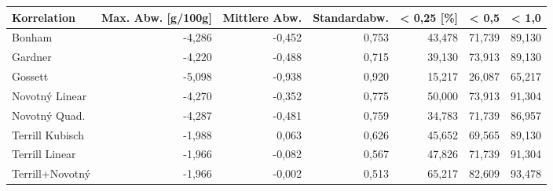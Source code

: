 \begin{tabular}{lrrrrrr}
\toprule
    Korrelation &  Max. Abw. [g/100g] &  Mittlere Abw. &  Standardabw. &  < 0,25 [\%] &  < 0,5 &  < 1,0 \\
\midrule
         Bonham &              -4,286 &         -0,452 &         0,753 &      43,478 & 71,739 & 89,130 \\
        Gardner &              -4,220 &         -0,488 &         0,715 &      39,130 & 73,913 & 89,130 \\
        Gossett &              -5,098 &         -0,938 &         0,920 &      15,217 & 26,087 & 65,217 \\
 Novotný Linear &              -4,270 &         -0,352 &         0,775 &      50,000 & 73,913 & 91,304 \\
  Novotný Quad. &              -4,287 &         -0,481 &         0,759 &      34,783 & 71,739 & 86,957 \\
Terrill Kubisch &              -1,988 &          0,063 &         0,626 &      45,652 & 69,565 & 89,130 \\
 Terrill Linear &              -1,966 &         -0,082 &         0,567 &      47,826 & 71,739 & 91,304 \\
Terrill+Novotný &              -1,966 &         -0,002 &         0,513 &      65,217 & 82,609 & 93,478 \\
\bottomrule
\end{tabular}
